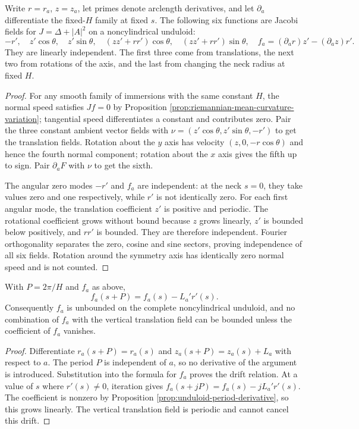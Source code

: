 \begin{proposition}\label{prop:unduloid-geometric-jacobi}
Write $r=r_a$, $z=z_a$, let primes denote arclength derivatives, and let $\partial_a$ differentiate the fixed-$H$ family at fixed $s$. The following six functions are Jacobi fields for $J=\Delta+|A|^2$ on a noncylindrical unduloid:
\[
 -r',\quad z'\cos\theta,\quad z'\sin\theta,\quad
 (zz'+rr')\cos\theta,\quad(zz'+rr')\sin\theta,\quad
 f_a=(\partial_ar)z'-(\partial_az)r'.
\]
They are linearly independent. The first three come from translations, the next two from rotations of the axis, and the last from changing the neck radius at fixed $H$.
\end{proposition}
\begin{proof}
For any smooth family of immersions with the same constant $H$, the normal speed satisfies $Jf=0$ by Proposition \ref{prop:riemannian-mean-curvature-variation}; tangential speed differentiates a constant and contributes zero. Pair the three constant ambient vector fields with $\nu=(z'\cos\theta,z'\sin\theta,-r')$ to get the translation fields. Rotation about the $y$ axis has velocity $(z,0,-r\cos\theta)$ and hence the fourth normal component; rotation about the $x$ axis gives the fifth up to sign. Pair $\partial_aF$ with $\nu$ to get the sixth.

The angular zero modes $-r'$ and $f_a$ are independent: at the neck $s=0$, they take values zero and one respectively, while $r'$ is not identically zero. For each first angular mode, the translation coefficient $z'$ is positive and periodic. The rotational coefficient grows without bound because $z$ grows linearly, $z'$ is bounded below positively, and $rr'$ is bounded. They are therefore independent. Fourier orthogonality separates the zero, cosine and sine sectors, proving independence of all six fields. Rotation around the symmetry axis has identically zero normal speed and is not counted.
\end{proof}

\begin{proposition}\label{prop:unduloid-neck-jacobi-drift}
With $P=2\pi/H$ and $f_a$ as above,
\[
 f_a(s+P)=f_a(s)-L_a'r'(s).
\]
Consequently $f_a$ is unbounded on the complete noncylindrical unduloid, and no combination of $f_a$ with the vertical translation field can be bounded unless the coefficient of $f_a$ vanishes.
\end{proposition}
\begin{proof}
Differentiate $r_a(s+P)=r_a(s)$ and $z_a(s+P)=z_a(s)+L_a$ with respect to $a$. The period $P$ is independent of $a$, so no derivative of the argument is introduced. Substitution into the formula for $f_a$ proves the drift relation. At a value of $s$ where $r'(s)\ne0$, iteration gives $f_a(s+jP)=f_a(s)-jL_a'r'(s)$. The coefficient is nonzero by Proposition \ref{prop:unduloid-period-derivative}, so this grows linearly. The vertical translation field is periodic and cannot cancel this drift.
\end{proof}

